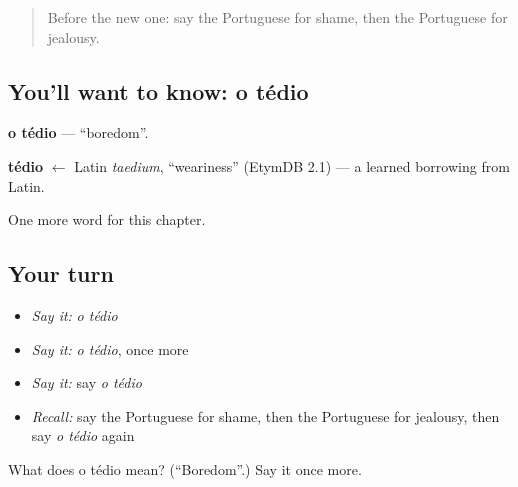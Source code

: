 \begin{quote}
Before the new one: say the Portuguese for shame, then the Portuguese for jealousy.
\end{quote}

\subsection*{You'll want to know: o tédio}
\textbf{o tédio} — \textquotedblleft{}boredom\textquotedblright{}.

\begin{cousinweb}
\textbf{tédio} $\leftarrow$ Latin \emph{taedium}, \textquotedblleft{}weariness\textquotedblright{} (EtymDB 2.1) — a learned borrowing from Latin.
\end{cousinweb}

\begin{grammarlens}[title={What you've built}]
One more word for this chapter.
\end{grammarlens}

\subsection*{Your turn}
\begin{itemize}
\raggedright
  \item \emph{Say it:} \emph{o tédio}
  \item \emph{Say it:} \emph{o tédio}, once more
  \item \emph{Say it:} say \emph{o tédio}
  \item \emph{Recall:} say the Portuguese for shame, then the Portuguese for jealousy, then say \emph{o tédio} again
\end{itemize}

\begin{tcolorbox}[breakable,colback=teal!4,colframe=teal!35!black,title={Before you move on}]
What does o tédio mean? (\textquotedblleft{}Boredom\textquotedblright{}.) Say it once more.
\end{tcolorbox}

